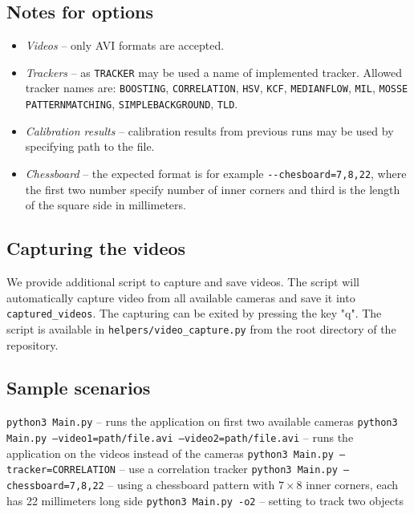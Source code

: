 \subsection{Notes for options}
\begin{itemize}
\item\emph{Videos} -- only AVI formats are accepted.
\item\emph{Trackers} -- as \verb+TRACKER+ may be used a name of implemented tracker.
Allowed tracker names are: 
\verb+BOOSTING+,
\verb+CORRELATION+,
\verb+HSV+,
\verb+KCF+,
\verb+MEDIANFLOW+,
\verb+MIL+,
\verb+MOSSE+
\verb+PATTERNMATCHING+,
\verb+SIMPLEBACKGROUND+,
\verb+TLD+.
\item\emph{Calibration results} -- calibration results from previous runs may be
used by specifying path to the file.
\item\emph{Chessboard} -- the expected format is for example
\verb+--chesboard=7,8,22+, where the first two number specify number of inner
corners and third is the length of the square side in millimeters.
\end{itemize}

\subsection{Capturing the videos} 

We provide additional script to capture and save videos. The script will
automatically capture video from all available cameras and save it into
\verb+captured_videos+. The capturing can be exited by pressing the key "q".
The script is available in \texttt{helpers/video\_capture.py} from the root
directory of the repository.  

\subsection{Sample scenarios}

\texttt{python3 Main.py} -- runs the application on first two available cameras
\newline
\texttt{python3 Main.py --video1=path/file.avi --video2=path/file.avi} -- runs the application on the videos instead of the cameras
\newline
\texttt{python3 Main.py --tracker=CORRELATION} -- use a correlation tracker
\newline
\texttt{python3 Main.py --chessboard=7,8,22} -- using a chessboard pattern with $7\times8$ inner corners, each has 22 millimeters long side
\newline
\texttt{python3 Main.py -o2} -- setting to track two objects
